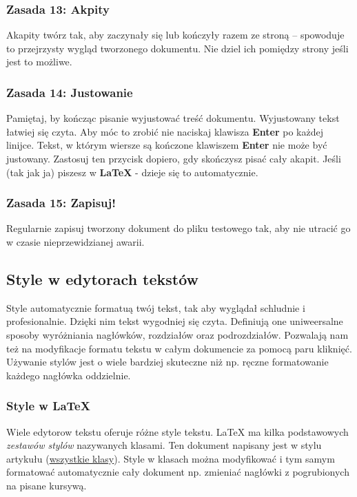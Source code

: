\documentclass[11pt,polish]{article}
\begin{document}
\subsubsection{Zasada 13: Akpity}
  Akapity twórz tak, aby zaczynały się lub kończyły razem ze stroną – spowoduje to przejrzysty wygląd tworzonego dokumentu. Nie dziel ich pomiędzy strony jeśli jest to możliwe.

\subsubsection{Zasada 14: Justowanie}
  Pamiętaj, by kończąc pisanie wyjustować treść dokumentu. Wyjustowany tekst łatwiej się czyta. Aby móc to zrobić nie naciskaj klawisza \textbf{Enter} po każdej linijce. Tekst, w którym wiersze są kończone klawiszem \textbf{Enter} nie może być justowany. Zastosuj ten przycisk dopiero, gdy skończysz pisać cały akapit. Jeśli (tak jak ja) piszesz w \textbf{\LaTeX} - dzieje się to automatycznie.

\subsubsection{Zasada 15: Zapisuj!}
  Regularnie zapisuj tworzony dokument do pliku testowego tak, aby nie utracić go w czasie nieprzewidzianej awarii.

\newpage

\subsection{Style w edytorach tekstów}
Style automatycznie formatuą twój tekst, tak aby wyglądał schludnie i profesionalnie. Dzięki nim tekst wygodniej się czyta. Definiują one uniweersalne sposoby wyróżniania nagłówków, rozdziałów oraz podrozdziałów. Pozwalają nam też na modyfikacje formatu tekstu w całym dokumencie za pomocą paru kliknięć. Używanie stylów jest o wiele bardziej skuteczne niż np. ręczne formatowanie każdego nagłówka oddzielnie.

\subsubsection{Style w \LaTeX}
  Wiele edytorow tekstu oferuje różne style tekstu. \LaTeX { }ma kilka podstawowych \emph{zestawów stylów} nazywanych klasami. Ten dokument napisany jest w stylu artykułu (\href{https://texfaq.org/FAQ-clsvpkg}{wszystkie klasy}). Style w klasach można modyfikować i tym samym formatować automatycznie cały dokument np. zmieniać nagłówki z pogrubionych na pisane kursywą. 
\end{document}
